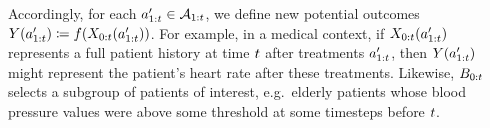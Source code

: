 Accordingly, for each $a_{1:t}' \in \mathcal{A}_{1:t}$, we define new potential outcomes
$Y(a_{1:t}') \coloneqq f(X_{0:t}(a_{1:t}'))$.
For example, in a medical context, if $X_{0:t}(a_{1:t}')$ represents a full patient history at time $t$ after treatments $a_{1:t}'$, then $Y(a_{1:t}')$ might represent the patient's heart rate after these treatments. 
Likewise, $B_{0:t}$ selects a subgroup of patients of interest, e.g.\ elderly patients whose blood pressure values were above some threshold at some timesteps before $t$.








